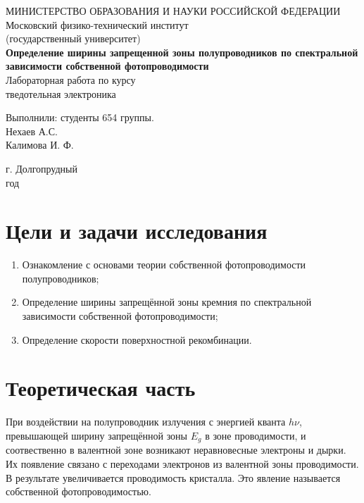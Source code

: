 \documentclass[a4paper, 12pt]{article}
\begin{document}
	\begin{titlepage}
		\begin{center}
		МИНИСТЕРСТВО ОБРАЗОВАНИЯ И НАУКИ РОССИЙСКОЙ ФЕДЕРАЦИИ\\
		\footnotesize{Московский физико-технический институт}\\
		\footnotesize{(государственный университет)}\\
		\vfill
		{\LARGE
		\textbf{Определение ширины запрещенной зоны полупроводников по спектральной зависимости собственной фотопроводимости}\\
		}
		\vspace{1cm}
		Лабораторная работа по курсу\\
		тведотельная электроника
		\vfill
		\begin{flushright}
			Выполнили: студенты 654 группы.\\
			Нехаев А.С.\\
            Калимова И. Ф.\\
		\end{flushright}
		\vfill
		г. Долгопрудный\\
		\the\year\:год
		\end{center}
	\end{titlepage}
	\newpage
	\tableofcontents
	\newpage
	\section{Цели и задачи исследования}
	\begin{enumerate}
		\item Ознакомление с основами теории собственной фотопроводимости полупроводников;
		\item Определение ширины запрещённой зоны кремния по спектральной зависимости собственной фотопроводимости;
		\item Определение скорости поверхностной рекомбинации.
    \end{enumerate}
    \section{Теоретическая часть}
    При воздействии на полупроводник излучения с энергией кванта $h\nu$, превышающей ширину запрещённой зоны $E_g$ в зоне проводимости, и соотвественно в валентной зоне возникают неравновесные электроны и дырки. Их появление связано с переходами электронов из валентной зоны проводимости. В результате увеличивается проводимость кристалла. Это явление называется собственной фотопроводимостью.
\end{document}
